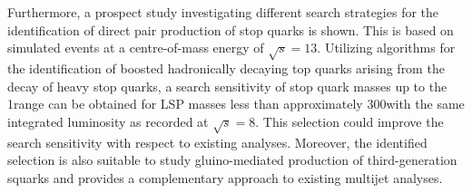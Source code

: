 Furthermore, a prospect study investigating different search strategies for the identification of direct pair production of stop quarks is shown. This is based on simulated events at a centre-of-mass energy of $\sqrt{s}=13$\tev. Utilizing algorithms for the identification of boosted hadronically decaying top quarks arising from the decay of heavy stop quarks, a search sensitivity of stop quark masses up to the 1\tev range can be obtained for LSP masses less than approximately 300\gev with the same integrated luminosity as recorded at $\sqrt{s}=8$\tev. This selection could improve the search sensitivity with respect to existing analyses. Moreover, the identified selection is also suitable to study gluino-mediated production of third-generation squarks and provides a complementary approach to existing multijet analyses.      
